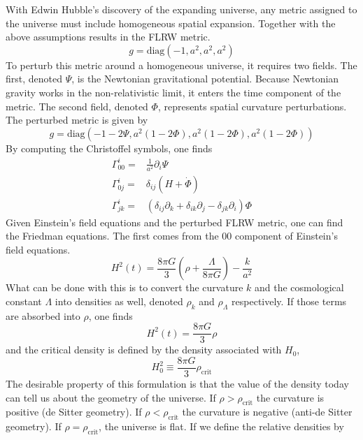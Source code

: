 With Edwin Hubble's discovery of the expanding universe, any metric assigned to the universe must include homogeneous spatial expansion. Together with the above assumptions results in the FLRW metric.
\begin{equation}
    g = \mathrm{diag}(-1,a^2,a^2,a^2)
\end{equation}
To perturb this metric around a homogeneous universe, it requires two fields. The first, denoted $\Psi$, is the Newtonian gravitational potential. Because Newtonian gravity works in the non-relativistic limit, it enters the time component of the metric. The second field, denoted $\Phi$, represents spatial curvature perturbations. The perturbed metric is given by
\begin{equation}
    g = \mathrm{diag}(-1-2\Psi,a^2(1-2\Phi),a^2(1-2\Phi),a^2(1-2\Phi))
\end{equation}
By computing the Christoffel symbols, one finds
\begin{equation}
    \begin{split}
        \Gamma^i_{00} =& \frac{1}{a^2}\partial_i\Psi \\
        \Gamma^i_{0j} =& \delta_{ij}(H+\dot\Phi) \\
        \Gamma^i_{jk} =& (\delta_{ij} \partial_k + \delta_{ik}\partial_j - \delta_{jk}\partial_i)\Phi
    \end{split}
\end{equation}
Given Einstein's field equations and the perturbed FLRW metric, one can find the Friedman equations. The first comes from the 00 component of Einstein's field equations.
\begin{equation}
    H^2(t) = \frac{8\pi G}{3}\left(\rho + \frac{\Lambda}{8\pi G}\right) - \frac{k}{a^2}
\end{equation}
What can be done with this is to convert the curvature $k$ and the cosmological constant $\Lambda$ into densities as well, denoted $\rho_k$ and $\rho_\Lambda$ respectively. If those terms are absorbed into $\rho$, one finds
\begin{equation}
    H^2(t) = \frac{8\pi G}{3}\rho
\end{equation}
and the critical density is defined by the density associated with $H_0$,
\begin{equation}
    H_0^2 \equiv \frac{8\pi G}{3}\rho_{\mathrm{crit}}
\end{equation}
The desirable property of this formulation is that the value of the density today can tell us about the geometry of the universe. If $\rho>\rho_{\mathrm{crit}}$ the curvature is positive (de Sitter geometry). If $\rho<\rho_{\mathrm{crit}}$ the curvature is negative (anti-de Sitter geometry). If $\rho=\rho_{\mathrm{crit}}$, the universe is flat. If we define the relative densities by
